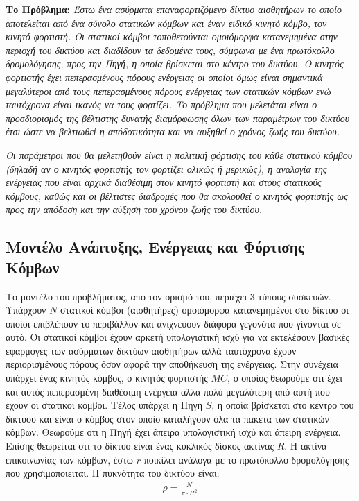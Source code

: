 \textbf{Το Πρόβλημα:} \textit{Έστω ένα ασύρματα επαναφορτιζόμενο δίκτυο αισθητήρων το οποίο αποτελείται από ένα σύνολο στατικών κόμβων και έναν ειδικό κινητό κόμβο,
τον κινητό φορτιστή. Οι στατικοί κόμβοι τοποθετούνται ομοιόμορφα κατανεμημένα στην περιοχή του δικτύου και διαδίδουν τα δεδομένα τους, σύμφωνα με ένα πρωτόκολλο
δρομολόγησης, προς την Πηγή, η οποία βρίσκεται στο κέντρο του δικτύου. Ο κινητός φορτιστής έχει πεπερασμένους πόρους ενέργειας οι οποίοι όμως είναι σημαντικά
μεγαλύτεροι από τους πεπερασμένους πόρους ενέργειας των στατικών κόμβων ενώ ταυτόχρονα είναι ικανός να τους φορτίζει. Το πρόβλημα που μελετάται είναι ο
προσδιορισμός της βέλτιστης δυνατής διαμόρφωσης όλων των παραμέτρων του δικτύου έτσι ώστε να βελτιωθεί η απόδοτικότητα και να αυξηθεί ο χρόνος ζωής του δικτύου.}

\textit{Οι παράμετροι που θα μελετηθούν είναι η πολιτική φόρτισης του κάθε στατικού κόμβου (δηλαδή αν ο κινητός φορτιστής τον φορτίζει ολικώς ή μερικώς), η αναλογία
της ενέργειας που είναι αρχικά διαθέσιμη στον κινητό φορτιστή και στους στατικούς κόμβους, καθώς και οι βέλτιστες διαδρομές που θα ακολουθεί ο κινητός φορτιστής ως
προς την απόδοση και την αύξηση του χρόνου ζωής του δικτύου.}



\subsection{Μοντέλο Ανάπτυξης, Ενέργειας και Φόρτισης Κόμβων}
Το μοντέλο του προβλήματος, από τον ορισμό του, περιέχει 3 τύπους συσκευών. Υπάρχουν $N$ στατικοί κόμβοι (αισθητήρες) ομοιόμορφα κατανεμημένοι στο δίκτυο οι
οποίοι επιβλέπουν το περιβάλλον και ανιχνεύουν διάφορα γεγονότα που γίνονται σε αυτό. Οι στατικοί κόμβοι έχουν αρκετή υπολογιστική ισχύ για να εκτελέσουν βασικές
εφαρμογές των ασύρματων δικτύων αισθητήρων αλλά ταυτόχρονα έχουν περιορισμένους πόρους όσον αφορά την αποθήκευση της ενέργειας. Στην συνέχεια υπάρχει ένας κινητός
κόμβος, ο κινητός φορτιστής $MC$, ο οποίος θεωρούμε οτι έχει και αυτός πεπερασμένη διαθέσιμη ενέργεια αλλά πολύ μεγαλύτερη από αυτή που έχουν οι στατικοί κόμβοι.
Τέλος υπάρχει η Πηγή $S$, η οποία βρίσκεται στο κέντρο του δικτύου και είναι ο κόμβος στον οποίο καταλήγουν όλα τα πακέτα των στατικών κόμβων. Θεωρούμε οτι η Πηγή
έχει άπειρα υπολογιστική ισχύ και άπειρη ενέργεια. Επίσης θεωρείται οτι το δίκτυο είναι ένας κυκλικός δίσκος ακτίνας $R$. Η ακτίνα επικοινωνίας των κόμβων, έστω $r$
ποικίλει ανάλογα με το πρωτόκολλο δρομολόγησης που χρησιμοποιείται. Η πυκνότητα του δικτύου είναι:
\begin{align*}
\rho = \frac{N}{\pi\cdot R^{2}}
\end{align*}

